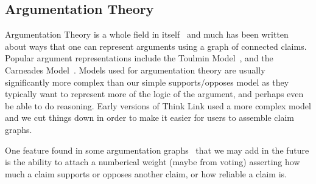 \documentclass{chi2009}
\begin{document}

\subsection{Argumentation Theory}

Argumentation Theory is a whole field in itself~\cite{argumentation,argmas} and much has been written about ways that one can represent arguments using a graph of connected claims. Popular argument representations include the Toulmin Model~\cite{toulmin}, and the Carneades Model~\cite{carneades}. Models used for argumentation theory are usually significantly more complex than our simple supports/opposes model as they typically want to represent more of the logic of the argument, and perhaps even be able to do reasoning. Early versions of Think Link used a more complex model and we cut things down in order to make it easier for users to assemble claim graphs.

One feature found in some argumentation graphs~\cite{Korb97acognitive} that we may add in the future is the ability to attach a numberical weight (maybe from voting) asserting how much a claim supports or opposes another claim, or how reliable a claim is.


%
\end{document}
